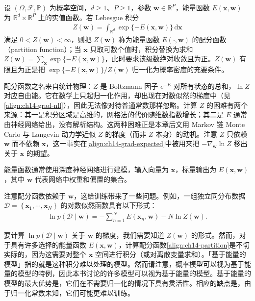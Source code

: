 \documentclass[../../main.tex]{subfiles}
\begin{document}
\begin{definition}[配分函数]\label{definition:ch14-配分函数}
设 $(\Omega,\mathcal{F},\mathbb{P})$ 为概率空间，$d\geqslant1$、$P\geqslant1$，参数 $\bm{w}\in\mathbb{R}^{P}$，能量函数 $E(\bm{x},\bm{w})$ 为 $\mathbb{R}^{d}\times\mathbb{R}^{P}$ 上的实值函数。若 Lebesgue 积分
\begin{align*}
Z(\bm{w})=\int_{\mathbb{R}^{d}}\exp\{-E(\bm{x},\bm{w})\}\,\mathrm{d}\bm{x}
\end{align*}
满足 $0<Z(\bm{w})<\infty$，则把 $Z(\bm{w})$ 称为能量函数 $E(\cdot,\bm{w})$ 的配分函数（partition function）；当 $\bm{x}$ 只取可数个值时，积分替换为求和 $Z(\bm{w})=\sum_{\bm{x}}\exp\{-E(\bm{x},\bm{w})\}$，此时要求该级数绝对收敛且为正。$Z(\bm{w})$ 有限且为正是把 $\exp\{-E(\bm{x},\bm{w})\}/Z(\bm{w})$ 归一化为概率密度的充要条件。
\end{definition}

\begin{remark}配分函数之名来自统计物理：$Z$ 是 Boltzmann 因子 $e^{-E}$ 对所有状态的总和，$\ln Z$ 对应自由能。它在数学上只起归一化作用，却出现在对数似然的梯度中（见\eqref{align:ch14-grad-nll}），因此无法像对待普通常数那样忽略。计算 $Z$ 的困难有两个来源：其一是积分区域是高维的，网格法的代价随维数指数增长；其二是 $E$ 通常由神经网络给出，没有解析结构。这两种困难正是本章后文用 Markov 链 Monte Carlo 与 Langevin 动力学近似 $Z$ 的梯度（而非 $Z$ 本身）的动机。注意 $Z$ 只依赖 $\bm{w}$ 而不依赖 $\bm{x}$，这一事实在\eqref{align:ch14-grad-expected}中被用来把 $-\nabla_{\bm{w}}\ln Z$ 移出关于 $\bm{x}$ 的期望。
\end{remark}

能量函数通常使用深度神经网络进行建模，输入向量为 $\bm{x}$，标量输出为 $E(\bm{x},\bm{w})$，其中 $\bm{w}$ 代表网络中权重和偏置的集合。

注意配分函数依赖于 $\bm{w}$，这给训练带来了一些问题。例如，一组独立同分布数据 $\mathcal{D}=\left\{\bm{x}_{1},\cdots,\bm{x}_{N}\right\}$ 的对数似然函数具有以下形式：
\begin{align}
\ln p(\mathcal{D}\mid\bm{w})=-\sum_{n=1}^{N}E\!\left(\bm{x}_{n},\bm{w}\right)-N\ln Z(\bm{w}).
\label{align:ch14-ebm-nll}
\end{align}

要计算 $\ln p(\mathcal{D}\mid\bm{w})$ 关于 $\bm{w}$ 的梯度，我们需要知道 $Z(\bm{w})$ 的形式。然而，对于具有许多选择的能量函数 $E(\bm{x},\bm{w})$，计算配分函数\eqref{align:ch14-partition}是不切实际的，因为这需要对整个 $\bm{x}$ 空间进行积分（或对离散变量求和）。「基于能量的模型」指的就是这种积分难以处理的模型。然而请注意，概率模型可以视为基于能量的模型的特例，因此本书讨论的许多模型可以视为基于能量的模型。基于能量的模型的最大优势是，它们在不需要归一化的情况下具有灵活性。相应的缺点是，由于归一化常数未知，它们可能更难以训练。
\end{document}
